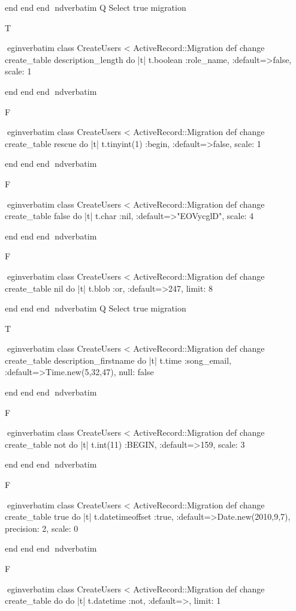     end 
  end 
end
nd{verbatim}
Q
 Select true migration

T

egin{verbatim}
 class CreateUsers < ActiveRecord::Migration 
  def change 
    create_table description_length do |t| 
      t.boolean :role_name, :default=>false, scale: 1
    
    end 
  end 
end
nd{verbatim}

F

egin{verbatim}
 class CreateUsers < ActiveRecord::Migration 
  def change 
    create_table rescue do |t| 
      t.tinyint(1) :begin, :default=>false, scale: 1
    
    end 
  end 
end
nd{verbatim}

F

egin{verbatim}
 class CreateUsers < ActiveRecord::Migration 
  def change 
    create_table false do |t| 
      t.char :nil, :default=>"EOVycglD", scale: 4
    
    end 
  end 
end
nd{verbatim}

F

egin{verbatim}
 class CreateUsers < ActiveRecord::Migration 
  def change 
    create_table nil do |t| 
      t.blob :or, :default=>247, limit: 8
    
    end 
  end 
end
nd{verbatim}
Q
 Select true migration

T

egin{verbatim}
 class CreateUsers < ActiveRecord::Migration 
  def change 
    create_table description_firstname do |t| 
      t.time :song_email, :default=>Time.new(5,32,47), null: false
    
    end 
  end 
end
nd{verbatim}

F

egin{verbatim}
 class CreateUsers < ActiveRecord::Migration 
  def change 
    create_table not do |t| 
      t.int(11) :BEGIN, :default=>159, scale: 3
    
    end 
  end 
end
nd{verbatim}

F

egin{verbatim}
 class CreateUsers < ActiveRecord::Migration 
  def change 
    create_table true do |t| 
      t.datetimeoffset :true, :default=>Date.new(2010,9,7), precision: 2, scale: 0
    
    end 
  end 
end
nd{verbatim}

F

egin{verbatim}
 class CreateUsers < ActiveRecord::Migration 
  def change 
    create_table do do |t| 
      t.datetime :not, :default=>, limit: 1
    
